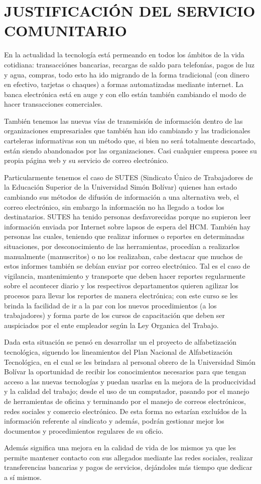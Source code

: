 \chapter{JUSTIFICACIÓN DEL SERVICIO COMUNITARIO}
        En la actualidad la tecnología está permeando en todos los ámbitos de la vida cotidiana: transacciónes bancarias, recargas de saldo para telefonías, pagos de luz y agua, compras, todo esto ha ido migrando de la forma tradicional (con dinero en efectivo, tarjetas o chaques) a formas automatizadas mediante internet. La banca electrónica está en auge y con ello están también cambiando el modo de hacer transacciones comerciales.
        
        También tenemos las nuevas vías de transmisión de información dentro de las organizaciones empresariales que también han ido cambiando y las tradicionales carteleras informativas son un método que, si bien no será totalmente descartado, están siendo abandonados por las organizaciones. Casi cualquier empresa posee su propia página web y su servicio de correo electrónico.

		Particularmente tenemos el caso de SUTES (Sindicato Único de Trabajadores de la Educación Superior de la Universidad Simón Bolívar) quienes han estado cambiando sus métodos de difusión de información a una alternativa web, el correo electrónico, sin embargo la información no ha llegado a todos los destinatarios. SUTES ha tenido personas desfavorecidas porque no supieron leer información enviada por Internet sobre lapsos de espera del HCM. También hay personas las cuales, teniendo que realizar informes o reportes en determinadas situaciones, por desconocimiento de las herramientas, procedían a realizarlos manualmente (manuscritos) o no los realizaban, cabe destacar que muchos de estos informes también se debían enviar por correo electrónico. Tal es el caso de vigilancia, mantenimiento y transporte que deben hacer reportes regularmente sobre el acontecer diario y los respectivos departamentos quieren agilizar los procesos para llevar los reportes de manera electrónica; con este curso se les brinda la facilidad de ir a la par con los nuevos procedimientos (a los trabajadores) y forma parte de los cursos de capacitación que deben ser auspiciados por el ente empleador según la Ley Organica del Trabajo.
        
        Dada esta situación se pensó en desarrollar un el proyecto de alfabetización tecnológica, siguendo los lineamientos del Plan Nacional de Alfabetización Tecnológica\cite{infocentro,PNAT}, en el cual se les brindara al personal obrero de la Universidad Simón Bolívar la oportunidad de recibir los conocimientos necesarios para que tengan acceso a las nuevas tecnologías y puedan usarlas en la mejora de la produccividad y la calidad del trabajo; desde el uso de un computador, pasando por el manejo de herramientas de oficina y terminando por el manejo de correos electrónicos, redes sociales y comercio electrónico. De esta forma no estarían excluídos de la información referente al sindicato y además, podrán gestionar mejor los documentos y procedimientos regulares de su oficio.
        
        Además significa una mejora en la calidad de vida de los mismos ya que les permite mantener contacto con sus allegados mediante las redes sociales, realizar transferencias bancarias y pagos de servicios, dejándoles más tiempo que dedicar a sí mismos.
	\pagebreak
